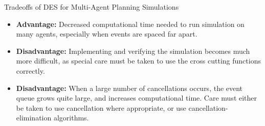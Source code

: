 \documentclass[aspectratio=1610,mathserif]{beamer}
\begin{document}
\begin{frame}{Tradeoffs of DES for Multi-Agent Planning Simulations}
    \begin{itemize}
        \item \textbf{Advantage:} Decreased computational time needed to run
            simulation on many agents, especially when events are spaced far
            apart.
        \item \textbf{Disadvantage:} Implementing and verifying the simulation
            becomes much more difficult, as special care must be taken to use
            the cross cutting functions correctly.
        \item \textbf{Disadvantage:} When a large number of cancellations
            occurs, the event queue grows quite large, and increases
            computational time. Care must either be taken to use cancellation
            where appropriate, or use cancellation-elimination algorithms.
    \end{itemize}
\end{frame}
\end{document}
